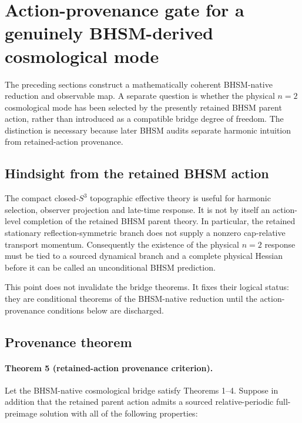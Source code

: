 \section{Action-provenance gate for a genuinely BHSM-derived cosmological mode}
\label{sec:bhsm-action-provenance}

The preceding sections construct a mathematically coherent BHSM-native
reduction and observable map.  A separate question is whether the physical
$n=2$ cosmological mode has been selected by the presently retained BHSM
parent action, rather than introduced as a compatible bridge degree of
freedom.  The distinction is necessary because later BHSM audits separate
harmonic intuition from retained-action provenance.

\subsection{Hindsight from the retained BHSM action}

The compact closed-$S^3$ topographic effective theory is useful for harmonic
selection, observer projection and late-time response.  It is not by itself
an action-level completion of the retained BHSM parent theory.  In particular,
the retained stationary reflection-symmetric branch does not supply a
nonzero cap-relative transport momentum.  Consequently the existence of the
physical $n=2$ response must be tied to a sourced dynamical branch and a
complete physical Hessian before it can be called an unconditional BHSM
prediction.

This point does not invalidate the bridge theorems.  It fixes their logical
status: they are conditional theorems of the BHSM-native reduction until the
action-provenance conditions below are discharged.

\subsection{Provenance theorem}

\paragraph{Theorem 5 (retained-action provenance criterion).}
Let the BHSM-native cosmological bridge satisfy Theorems 1--4.  Suppose in
addition that the retained parent action admits a sourced relative-periodic
full-preimage solution with all of the following properties:

